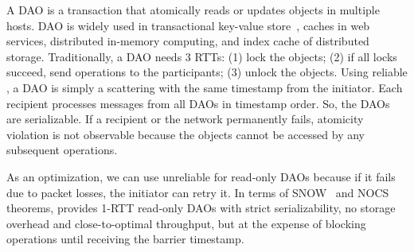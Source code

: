 A DAO is a transaction that atomically reads or updates objects in multiple hosts. DAO is widely used in transactional key-value store~\cite{dey2014ycsbt}, caches in web services, distributed in-memory computing, and index cache of distributed storage.
Traditionally, a DAO needs 3 RTTs: (1) lock the objects; (2) if all locks succeed, send operations to the participants; (3) unlock the objects.
Using reliable \sys{}, a DAO is simply a scattering with the same timestamp from the initiator.
Each recipient processes messages from all DAOs in timestamp order. So, the DAOs are serializable.
If a recipient or the network permanently fails, atomicity violation is not observable because the objects cannot be accessed by any subsequent operations.


As an optimization, we can use unreliable \sys{} for read-only DAOs because if it fails due to packet losses, the initiator can retry it.
In terms of SNOW~\cite{lu2016snow} and NOCS~\cite{lu2020performance} theorems, \sys{} provides 1-RTT read-only DAOs with strict serializability, no storage overhead and close-to-optimal throughput, but at the expense of blocking operations until receiving the barrier timestamp.





